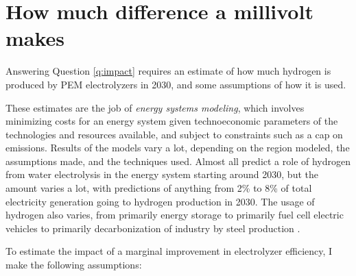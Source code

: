 
\section{How much difference a millivolt makes}\label{sec:millivolt}

Answering Question \ref{q:impact} requires an estimate of how much hydrogen is produced by PEM electrolyzers in 2030, and some assumptions of how it is used.

These estimates are the job of \textit{energy systems modeling}, which involves minimizing costs for an energy system given technoeconomic parameters of the technologies and resources available, and subject to constraints such as a cap on  emissions\cite{Storgaard2019_MSc}. Results of the models vary a lot, depending on the region modeled, the assumptions made, and the techniques used. Almost all predict a role of hydrogen from water electrolysis in the energy system starting around 2030, but the amount varies a lot, with predictions of anything from 2\% to 8\% of total electricity generation going to hydrogen production in 2030. The usage of hydrogen also varies, from primarily energy storage\cite{Budischak2013, Storgaard2019_MSc, Jacobson2018} to primarily fuel cell electric vehicles\cite{Meibom2010} to primarily decarbonization of industry by steel production \cite{Sgobbi2016}. 

To estimate the impact of a marginal improvement in electrolyzer efficiency, I make the following assumptions:

